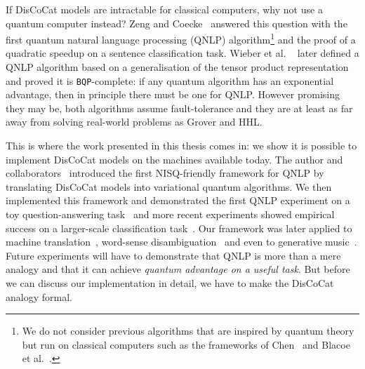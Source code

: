 If DisCoCat models are intractable for classical computers, why not use a quantum computer instead?
Zeng and Coecke~\cite{ZengCoecke16} answered this question with the first quantum natural language processing (QNLP) algorithm\footnote
{We do not consider previous algorithms that are inspired by quantum theory but run on classical computers such as the frameworks of Chen~\cite{Chen02} and Blacoe et al.~\cite{BlacoeEtAl13}.}
and the proof of a quadratic speedup on a sentence classification task.
Wieber et al. ~\cite{WiebeEtAl19} later defined a QNLP algorithm based on a generalisation of the tensor product representation and proved it is \texttt{BQP}-complete: if any quantum algorithm has an exponential advantage, then in principle there must be one for QNLP.
However promising they may be, both algorithms assume fault-tolerance and they are at least as far away from solving real-world problems as Grover and HHL.

This is where the work presented in this thesis comes in: we show it is possible to implement DisCoCat models on the machines available today.
The author and collaborators~\cite{MeichanetzidisEtAl20a,CoeckeEtAl20} introduced the first NISQ-friendly framework for QNLP by translating DisCoCat models into variational quantum algorithms.
We then implemented this framework and demonstrated the first QNLP experiment on a toy question-answering task~\cite{MeichanetzidisEtAl20} and more recent experiments showed empirical success on a larger-scale classification task~\cite{LorenzEtAl21}.
Our framework was later applied to machine translation~\cite{AbbaszadeEtAl21,VicenteNieto21}, word-sense disambiguation~\cite{Hoffmann21} and even to generative music~\cite{MirandaEtAl21}.
Future experiments will have to demonstrate that QNLP is more than a mere analogy and that it can achieve \emph{quantum advantage on a useful task}.
But before we can discuss our implementation in detail, we have to make the DisCoCat analogy formal.
